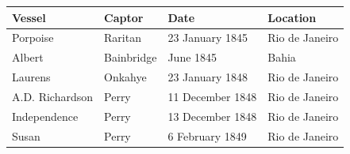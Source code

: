 \documentclass{article}
\begin{document}
\begin{tabular}{llll}
\toprule
Vessel & Captor & Date & Location \\
\midrule
Porpoise & Raritan & 23 January 1845 & Rio de Janeiro \\
Albert & Bainbridge & June 1845 & Bahia \\
Laurens & Onkahye & 23 January 1848 & Rio de Janeiro \\
A.D. Richardson & Perry & 11 December 1848 & Rio de Janeiro \\
Independence & Perry & 13 December 1848 & Rio de Janeiro \\
Susan & Perry & 6 February 1849 & Rio de Janeiro \\
\bottomrule
\end{tabular}
\end{document}
